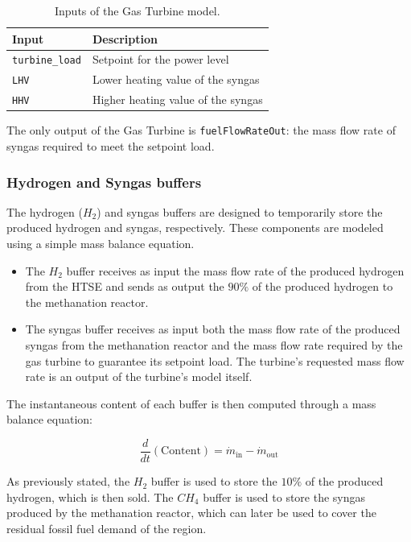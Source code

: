 \begin{table}[H]
\centering
\begin{tabular}{ll}
\toprule
\textbf{Input} & \textbf{Description} \\
\midrule
\verb|turbine_load| & Setpoint for the power level \\
\verb|LHV| & Lower heating value of the syngas \\
\verb|HHV| & Higher heating value of the syngas \\
\bottomrule
\end{tabular}
\caption{Inputs of the Gas Turbine model.}
\end{table}

The only output of the Gas Turbine is \verb|fuelFlowRateOut|: the mass flow rate of syngas required to meet the setpoint load.

\subsubsection{Hydrogen and Syngas buffers}
The hydrogen ($H_2$) and syngas buffers are designed to temporarily store the produced hydrogen and syngas, respectively. These components are modeled using a simple mass balance equation.

\begin{itemize}
  \item The $H_2$ buffer receives as input the mass flow rate of the produced hydrogen from the HTSE and sends as output the $90\%$ of the produced hydrogen to the methanation reactor.
  \item The syngas buffer receives as input both the mass flow rate of the produced syngas from the methanation reactor and the mass flow rate required by the gas turbine to guarantee 
  its setpoint load. The turbine's requested mass flow rate is an output of the turbine's model itself.
\end{itemize}

The instantaneous content of each buffer is then computed through a mass balance equation:

\begin{equation}
  \frac{d}{dt}\left(\mathrm{Content}\right) = \dot{m}_{\mathrm{in}} - \dot{m}_{\mathrm{out}}
\end{equation}

As previously stated, the $H_2$ buffer is used to store the $10\%$ of the produced hydrogen, which is then sold.
The $CH_4$ buffer is used to store the syngas produced by the methanation reactor, which can later be used to cover the residual fossil fuel demand of the region.

